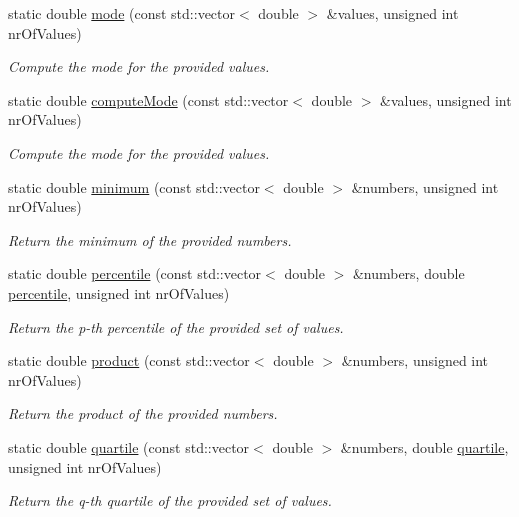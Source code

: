 \begin{DoxyCompactItemize}
static double \hyperlink{classmultiscale_1_1Numeric_abd90392bc165b82d9352e68cd4969373}{mode} (const std\-::vector$<$ double $>$ \&values, unsigned int nr\-Of\-Values)
\begin{DoxyCompactList}\small\item\em \-Compute the mode for the provided values. \end{DoxyCompactList}\item 
static double \hyperlink{classmultiscale_1_1Numeric_a8e8b37fd814847d7f15bdd9a7a6a7ae3}{compute\-Mode} (const std\-::vector$<$ double $>$ \&values, unsigned int nr\-Of\-Values)
\begin{DoxyCompactList}\small\item\em \-Compute the mode for the provided values. \end{DoxyCompactList}\item 
static double \hyperlink{classmultiscale_1_1Numeric_ac4c6e362613cb29641e1762b75489beb}{minimum} (const std\-::vector$<$ double $>$ \&numbers, unsigned int nr\-Of\-Values)
\begin{DoxyCompactList}\small\item\em \-Return the minimum of the provided numbers. \end{DoxyCompactList}\item 
static double \hyperlink{classmultiscale_1_1Numeric_a718a94c1f6ccfc038f2260a590e62ce4}{percentile} (const std\-::vector$<$ double $>$ \&numbers, double \hyperlink{classmultiscale_1_1Numeric_aff0c6b0c3d82bec3761a5e2d08394513}{percentile}, unsigned int nr\-Of\-Values)
\begin{DoxyCompactList}\small\item\em \-Return the p-\/th percentile of the provided set of values. \end{DoxyCompactList}\item 
static double \hyperlink{classmultiscale_1_1Numeric_a8e24dd3dea31a0180d7c01d6c019aba4}{product} (const std\-::vector$<$ double $>$ \&numbers, unsigned int nr\-Of\-Values)
\begin{DoxyCompactList}\small\item\em \-Return the product of the provided numbers. \end{DoxyCompactList}\item 
static double \hyperlink{classmultiscale_1_1Numeric_ae00445066d24b46353bfb648a2588a99}{quartile} (const std\-::vector$<$ double $>$ \&numbers, double \hyperlink{classmultiscale_1_1Numeric_a127a2b3e5e659b4e493767ba23fc45da}{quartile}, unsigned int nr\-Of\-Values)
\begin{DoxyCompactList}\small\item\em \-Return the q-\/th quartile of the provided set of values. \end{DoxyCompactList}\item 

\end{DoxyCompactItemize}
